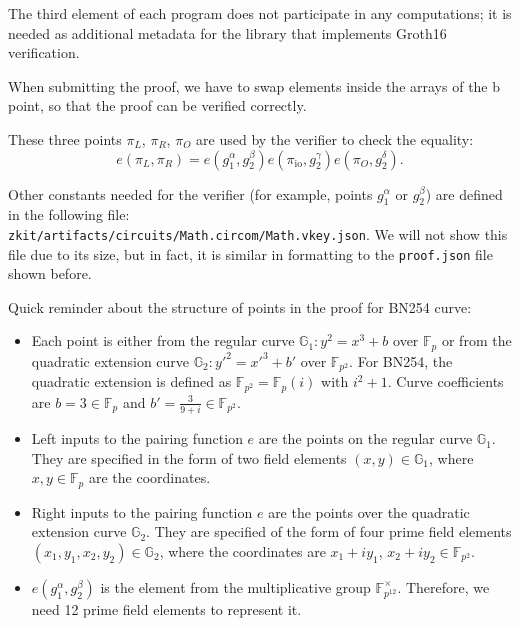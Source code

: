 \documentclass[../lecture-notes.tex]{subfiles}
\begin{document}
    The third element of each program does not participate in any computations; it is needed as additional metadata for the library that implements Groth16 verification.

    \begin{remark}
        When submitting the proof, we have to swap elements inside the arrays of the b point, so that the proof can be verified correctly.
    \end{remark}

    These three points $\pi_L$, $\pi_R$, $\pi_O$ are used by the verifier to check the equality:
    \[
        e(\pi_L, \pi_R) = e(g_1^\alpha, g_2^\beta)e(\pi_{\text{io}},g_2^\gamma)e(\pi_O,g_2^\delta).
    \]

    Other constants needed for the verifier (for example, points $g_1^{\alpha}$ or $g_2^{\beta}$) are defined
    in the following file: \\ \texttt{zkit/artifacts/circuits/Math.circom/Math.vkey.json}. 
    We will not show this file due to its size, but in fact, it is similar in formatting to the \texttt{proof.json}
    file shown before.

    Quick reminder about the structure of points in the proof for BN254 curve:
    \begin{itemize}
        \item Each point is either from the regular curve $\mathbb{G}_1: y^2=x^3+b$ over $\mathbb{F}_p$ or from the quadratic extension curve $\mathbb{G}_2: y'^2=x'^3+b'$ over $\mathbb{F}_{p^2}$. For BN254, the quadratic extension is defined as $\mathbb{F}_{p^2} = \mathbb{F}_p(i)$ with $i^2+1$. Curve coefficients are $b=3 \in \mathbb{F}_p$ and $b'=\frac{3}{9+i} \in \mathbb{F}_{p^2}$.
        \item Left inputs to the pairing function $e$ are the points on the regular curve $\mathbb{G}_1$. They are specified in the form of two field elements $(x,y) \in \mathbb{G}_1$, where $x, y \in \mathbb{F}_p$ are the coordinates.
        \item Right inputs to the pairing function $e$ are the points over the quadratic extension curve $\mathbb{G}_2$. They are specified of the form of four prime field elements $(x_{1}, y_{1}, x_{2}, y_2) \in \mathbb{G}_2$, where the coordinates are $x_1+iy_1$, $x_2+iy_2 \in \mathbb{F}_{p^2}$.
        \item $e(g_1^{\alpha}, g_2^{\beta})$ is the element from the multiplicative group $\mathbb{F}_{p^{12}}^{\times}$. Therefore, we need 12 prime field elements to represent it.
    \end{itemize}
\end{document}
